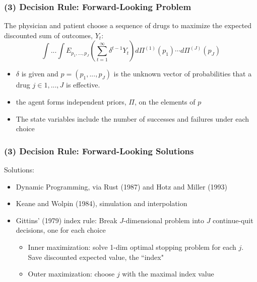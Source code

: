 
\begin{frame}
\frametitle{(3) Decision Rule: Forward-Looking Problem}
\small

The physician and patient choose a sequence of drugs to maximize the
expected discounted sum of outcomes, $Y_{t}$: 
\begin{equation}
\int ...\int E_{p_{1},...,p_{J}}\left( \sum_{t=1}^{\infty }\delta
^{t-1}Y_{t}\right) d\Pi ^{(1)}(p_{1})\cdots d\Pi ^{(J)}(p_{J})
\label{seq_prob}
\end{equation}

\begin{itemize}
\item $\delta$ is given and $p=(p_{1},...,p_{J})$ is the unknown vector of
probabilities that a drug $j\in{1,...,J}$ is effective.

\item the agent forms independent priors, $\Pi $, on the elements of $p$

\item The state variables include the number of successes and failures under
each choice
\end{itemize}
\end{frame}


\begin{frame}[label=ALTERNATIVES]

\frametitle{(3) Decision Rule: Forward-Looking Solutions}
\small

Solutions:

\begin{itemize}
\item Dynamic Programming, via Rust (1987) and Hotz and Miller (1993)

\item Keane and Wolpin (1984), simulation and interpolation

\item Gittins' (1979) index rule: Break $J$-dimensional problem into $J$
continue-quit decisions, one for each choice

\begin{itemize}
\item Inner maximization: solve 1-dim optimal stopping problem for each $j$.
Save discounted expected value, the ``index"

\item Outer maximization: choose $j$ with the maximal index value
\end{itemize}
\end{itemize}
\end{frame}

